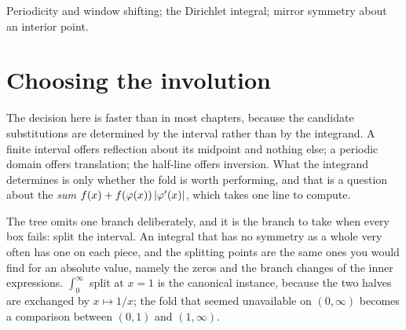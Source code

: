 \begin{seealsob}Periodicity and window shifting; the Dirichlet integral; mirror symmetry about an interior point.\end{seealsob}

\section{Choosing the involution}

The decision here is faster than in most chapters, because the candidate substitutions are determined by the interval rather than by the integrand. A finite interval offers reflection about its midpoint and nothing else; a periodic domain offers translation; the half-line offers inversion. What the integrand determines is only whether the fold is worth performing, and that is a question about the \emph{sum} $f(x)+f(\varphi(x))\left\lvert \varphi'(x)\right\rvert$, which takes one line to compute.

\begin{center}
\end{center}

The tree omits one branch deliberately, and it is the branch to take when every box fails: split the interval. An integral that has no symmetry as a whole very often has one on each piece, and the splitting points are the same ones you would find for an absolute value, namely the zeros and the branch changes of the inner expressions. $\int_0^{\infty}$ split at $x=1$ is the canonical instance, because the two halves are exchanged by $x\mapsto1/x$; the fold that seemed unavailable on $(0,\infty)$ becomes a comparison between $(0,1)$ and $(1,\infty)$.

